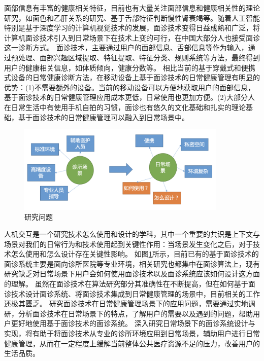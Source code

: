 
面部信息有丰富的健康相关特征\cite{ding2019reading}，目前也有大量关注面部信息和健康相关性的理论研究，如面色和乙肝关系的研究\cite{吴秀艳2014108}、基于舌部特征判断慢性肾衰竭\cite{周小芳2018慢性肾衰患者虚兼湿浊证的口唇特征研究}等。随着人工智能特别是基于深度学习的计算机视觉技术\cite{hassaballah2020deep}的发展，面诊技术变得日益成熟和广泛，将计算机面诊技术引入到日常场景下在技术上变的可行，在中国大部分人也接受面诊这一诊断方式。
面诊技术，主要通过用户的面部信息、舌部信息等作为输入，通过预处理、面部兴趣区域提取、特征提取、特征分类、规则系统等方法，最终得到用户的健康相关信息，如体质倾向，健康分数等\cite{林锋2019中医面诊系统调研报告}。
相比当前的基于穿戴式和便携式设备的日常健康诊断方法，在移动设备上基于面诊技术的日常健康管理有明显的优势：(1)不需要额外的设备。当前的移动设备可以方便地获取用户的面部信息，基于面诊技术的日常健康管理应用成本更低，日常使用也更加方便。(2)大部分人在日常生活中有使用手机自拍的习惯，面诊也有悠久的文化基础和扎实的理论基础，基于面诊技术的日常健康管理可以融入到日常场景中。

\begin{figure}
    \centering
    \includegraphics[width=10cm]{images/scenario.png}
    \caption{研究问题}
    \label{fig:scenario}
\end{figure}

人机交互是一个研究技术怎么使用和设计的学科，其中一个重要的共识是上下文与场景对我们的日常行为和技术使用起到关键性作用：当场景发生变化之后，对于技术怎么使用和怎么设计存在关键性影响\cite{1987Plans}。
如图\ref{fig:scenario}所示，目前已有的基于面诊技术的面诊系统主要是面向诊所医院等专业环境，相关研究也都集中在面诊算法上，现有研究缺乏对日常场景下用户会如何使用面诊技术以及面诊系统应该如何设计这方面的理解。
虽然在面诊技术在算法研究部分其准确性在不断提高，但在如何基于面诊技术设计面诊系统、将面诊技术集成到日常健康管理的场景中，目前相关的工作还极其匮乏。
研究面诊技术在日常健康管理场景下的应用问题，需要通过实地调研，分析面诊技术在日常场景下的特点，了解用户的需要以及遇到的问题，帮助用户更好地使用基于面诊技术的面诊系统。
深入研究日常场景下的面诊系统设计与实现，将有助于将面诊技术从专业的诊所环境应用到日常场景，辅助用户进行日常健康管理，从而在一定程度上缓解当前整体公共医疗资源不足的压力，改善用户的生活品质。

